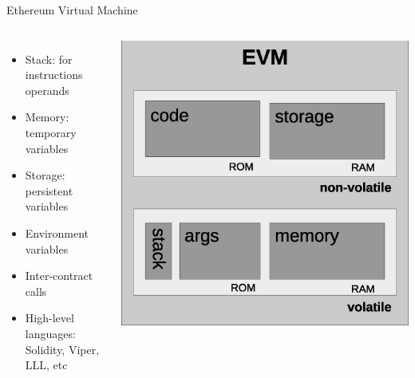 \documentclass{beamer}
\begin{document}
\begin{frame}{Ethereum Virtual Machine}
	\begin{columns}[c]
		\begin{itemize}
			\item Stack: for instructions operands
			\item Memory: temporary variables
			\item Storage: persistent variables
			\item Environment variables
			\item Inter-contract calls
			\item High-level languages:
			Solidity, Viper, LLL, etc
		\end{itemize}
		\includegraphics[scale=0.3]{Figures/evm.eps}
	\end{columns}
\end{frame}
\end{document}
